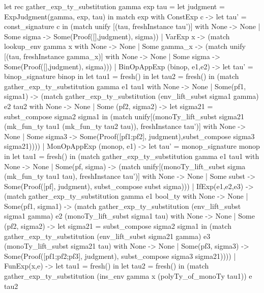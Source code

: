 let rec gather_exp_ty_substitution gamma exp tau =
    let judgment = ExpJudgment(gamma, exp, tau) in
    match exp
    with ConstExp c ->
         let tau' = const_signature c in
         (match unify [(tau, freshInstance tau')]
          with None       -> None
             | Some sigma -> Some(Proof([],judgment), sigma))
    | VarExp x -> 
      (match lookup_env gamma x with None -> None
       | Some gamma_x ->
         (match unify [(tau, freshInstance gamma_x)]
          with None       -> None
             | Some sigma -> Some(Proof([],judgment), sigma)))
    | BinOpAppExp (binop, e1,e2) ->
      let tau' = binop_signature binop in
      let tau1 = fresh() in
      let tau2 = fresh() in
      (match gather_exp_ty_substitution gamma e1 tau1
       with None -> None
       | Some(pf1, sigma1) ->
         (match gather_exp_ty_substitution (env_lift_subst sigma1 gamma) e2 tau2
          with None -> None
          | Some (pf2, sigma2) ->
            let sigma21 = subst_compose sigma2 sigma1 in
            (match unify[(monoTy_lift_subst sigma21
                          (mk_fun_ty tau1 (mk_fun_ty tau2 tau)),
                         freshInstance tau')]
             with None -> None
             | Some sigma3 -> 
               Some(Proof([pf1;pf2], judgment),subst_compose sigma3 sigma21))))
    | MonOpAppExp (monop, e1) ->
      let tau' = monop_signature monop in
      let tau1 = fresh() in
      (match gather_exp_ty_substitution gamma e1 tau1
       with None -> None
       | Some(pf, sigma) ->
         (match unify[(monoTy_lift_subst sigma (mk_fun_ty tau1 tau),
                       freshInstance tau')]
          with None -> None
          | Some subst ->
            Some(Proof([pf], judgment),
                 subst_compose subst sigma)))
    | IfExp(e1,e2,e3) ->
      (match gather_exp_ty_substitution gamma e1 bool_ty
       with None -> None
       | Some(pf1, sigma1) ->
         (match gather_exp_ty_substitution
                (env_lift_subst sigma1 gamma) e2 (monoTy_lift_subst sigma1 tau)
          with None -> None
          | Some (pf2, sigma2) ->
            let sigma21 = subst_compose sigma2 sigma1 in
            (match gather_exp_ty_substitution
                   (env_lift_subst sigma21 gamma) e3
                   (monoTy_lift_subst sigma21 tau)
             with  None -> None
             | Some(pf3, sigma3) ->
               Some(Proof([pf1;pf2;pf3], judgment), subst_compose sigma3 sigma21))))
    | FunExp(x,e) ->
      let tau1 = fresh() in
      let tau2 = fresh() in
      (match gather_exp_ty_substitution
             (ins_env gamma x (polyTy_of_monoTy tau1)) e tau2
